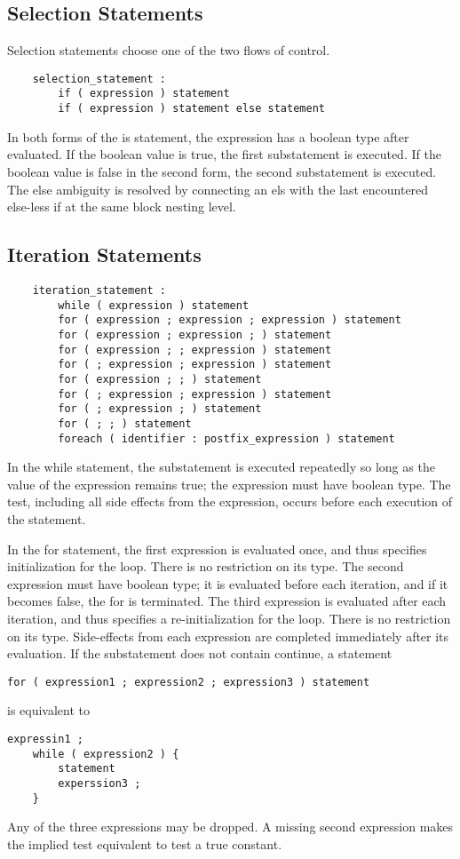 \documentclass[letterpaper,12pt]{article}
\begin{document}
\subsection{Selection Statements}
Selection statements choose one of the two flows of control.
\begin{lstlisting}
	selection_statement :
		if ( expression ) statement
		if ( expression ) statement else statement
\end{lstlisting}
In both forms of the is statement, the expression has a boolean type after evaluated. If the boolean value is true, the first substatement is executed. If the boolean value is false in the second form, the second substatement is executed. The else ambiguity is resolved by connecting an els with the last encountered else-less if at the same block nesting level.

\subsection{Iteration Statements}
\begin{lstlisting}
	iteration_statement :
		while ( expression ) statement
		for ( expression ; expression ; expression ) statement
		for ( expression ; expression ; ) statement
		for ( expression ; ; expression ) statement
		for ( ; expression ; expression ) statement
		for ( expression ; ; ) statement
		for ( ; expression ; expression ) statement
		for ( ; expression ; ) statement
		for ( ; ; ) statement
		foreach ( identifier : postfix_expression ) statement
\end{lstlisting}
In the while statement, the substatement is executed repeatedly so long as the value of the expression remains true; the expression must have boolean type. The test, including all side effects from the expression, occurs before each execution of the statement. \newline

In the for statement, the first expression is evaluated once, and thus specifies initialization for the loop. There is no restriction on its type. The second expression must have boolean type; it is evaluated before each iteration, and if it becomes false, the for is terminated. The third expression is evaluated after each iteration, and thus specifies a re-initialization for the loop. There is no restriction on its type. Side-effects from each expression are completed immediately after its evaluation. If the substatement does not contain continue, a statement
\begin{lstlisting}[frame=none]
	for ( expression1 ; expression2 ; expression3 ) statement
\end{lstlisting}
is equivalent to
\begin{lstlisting}[frame=none]
	expressin1 ;
	while ( expression2 ) {
		statement
		experssion3 ;
	}
\end{lstlisting}
Any of the three expressions may be dropped. A missing second expression makes the implied test equivalent to test a true constant. \newline
\end{document}
